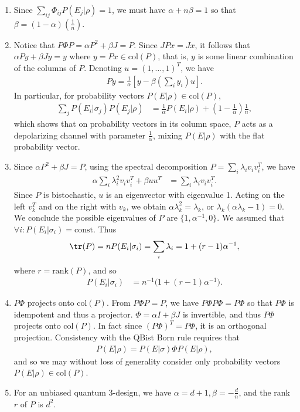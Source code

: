 \documentclass[11pt]{article}
\begin{document}
\begin{enumerate}
\item Since $\sum_{ij} \Phi_{ij} P(E_j|\rho)=1$, we must have $\alpha +n\beta = 1$ so that $\beta = (1-\alpha)\left(\frac{1}{n}\right)$.
\item Notice that $P\Phi P	= \alpha P^2+\beta J=P$. Since $JPx=Jx$, it follows that $\alpha Py+\beta Jy=y$ where $y = Px \in \text{col}(P)$, that is, $y$ is some linear combination of the columns of $P$. Denoting $u=(1,\dots, 1)^T$, we have
\begin{align}
Py = \frac{1}{\alpha}\left[y-\beta\left(\sum_i y_i\right)u\right].
\end{align}
In particular, for probability vectors $P(E|\rho) \in \text{col}(P)$,
\begin{align}
\sum_{j}P(E_i|\sigma_j)P(E_j|\rho)&=\frac{1}{\alpha}P(E_i|\rho) +\left(1-\frac{1}{\alpha}\right)\frac{1}{n},
\end{align}
which shows that on probability vectors in its column space, $P$ acts as a depolarizing channel with parameter $\frac{1}{\alpha}$, mixing $P(E|\rho)$ with the flat probability vector.
\item  Since $\alpha P^2+\beta J = P$, using the spectral decomposition $P=\sum_i \lambda_i v_i v_i^T$, we have
\begin{align}
\alpha \sum_i \lambda_i^2 v_i v_i^T+\beta u u^T&= \sum_i \lambda_i v_i v_i^T.
\end{align}
Since $P$ is bistochastic, $u$ is an eigenvector with eigenvalue 1. Acting on the left $v_k^T$ and on the right with $v_k$, we obtain $\alpha \lambda_k^2 =\lambda_k $, or $\lambda_k(\alpha \lambda_k-1)=0$. We conclude the possible eigenvalues of $P$ are $\{1, \alpha^{-1}, 0\}$. We assumed that $\forall i: P(E_i|\sigma_i)=\text{const}.$ Thus 
\begin{align}
\tr(P) = n P(E_i|\sigma_i)=\sum_i\lambda_i=1+(r-1)\alpha^{-1},
\end{align}
where $r=\text{rank}(P)$, and so
\begin{align}
P(E_i|\sigma_i) &= n^{-1}	\big(1+(r-1)\alpha^{-1}\big).
\end{align}
\item  $P\Phi$ projects onto $\text{col}(P)$. From $P\Phi P=P$, we have $P\Phi P \Phi=P\Phi$ so that $P\Phi$ is idempotent and thus a projector. $\Phi = \alpha I + \beta J$ is invertible, and thus $P\Phi$ projects onto $\text{col}(P)$. In fact since $(P\Phi)^T=P\Phi$, it is an orthogonal projection. Consistency with the QBist Born rule requires that
\begin{align}
P(E|\rho) =P(E|\sigma)\Phi P(E|\rho),
\end{align}
and so we may without loss of generality consider only probability vectors $P(E|\rho) \in \text{col}(P)$.
\item For an unbiased quantum 3-design, we have $\alpha=d+1, \beta=-\frac{d}{n}$, and the rank $r$ of $P$ is $d^2$.
\end{enumerate}
\end{document}
